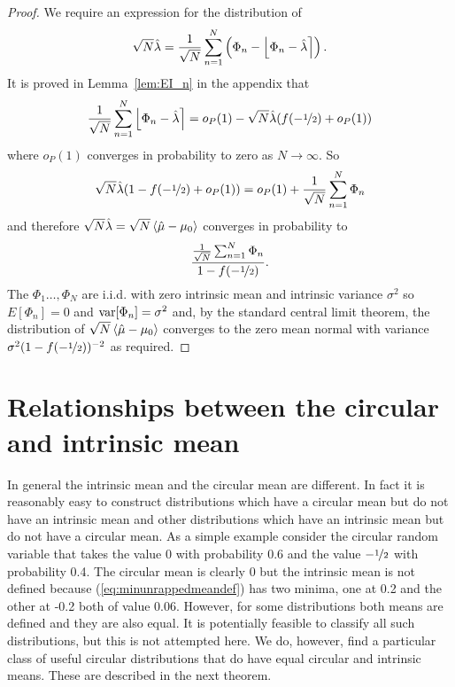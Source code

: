 \documentclass[journal]{../bib/IEEEtran}
\begin{document}
\begin{proof}
We require an expression for the distribution of
\[
\sqrt{N}\hat{\lambda} = \frac{1}{\sqrt{N}}\sum_{n=1}^{N} \left( \Phi_n - {\left\lfloor  \Phi_n - \hat{\lambda}  \right\rceil}\right).
\]
It is proved in Lemma~\ref{lem:EI_n} in the appendix that
\[
\frac{1}{\sqrt{N}}\sum_{n=1}^{N} {\left\lfloor  \Phi_n - \hat{\lambda} \right\rceil} = o_P(1)  - \sqrt{N} \hat{\lambda}( f(-\nicefrac{1}{2}) + o_P(1) )
\]
where $o_P(1)$ converges in probability to zero as $N\rightarrow\infty$.  So
\[
\sqrt{N}\hat{\lambda}(1 - f(-\nicefrac{1}{2}) + o_P(1) ) = o_P(1) + \frac{1}{\sqrt{N}}\sum_{n=1}^{N} \Phi_n
\]
and therefore $\sqrt{N}\hat{\lambda} = \sqrt{N}\left< \hat{\mu} - \mu_0 \right>$ converges in probability to
\[
\frac{\frac{1}{\sqrt{N}}\sum_{n=1}^{N} \Phi_n}{1 - f(-\nicefrac{1}{2})}.
\]
The $\Phi_1\dots,\Phi_N$ are i.i.d. with zero intrinsic mean and intrinsic variance $\sigma^2$ so $E[\Phi_n] = 0$ and $\operatorname{var}[\Phi_n] = \sigma^2$ and, by the standard central limit theorem, the distribution of $\sqrt{N}\left< \hat{\mu} - \mu_0 \right>$ converges to the zero mean normal with variance $\sigma^2(1 - f(-\nicefrac{1}{2}))^{-2}$ as required. 
\end{proof}



\section{Relationships between the circular and intrinsic mean}\label{sec:relationships_circ_intrinsic_mean}

In general the intrinsic mean and the circular mean are different. In fact it is reasonably easy to construct distributions which have a circular mean but do not have an intrinsic mean and other distributions which have an intrinsic mean but do not have a circular mean. As a simple example consider the circular random variable that takes the value 0 with probability 0.6 and the value $-\nicefrac{1}{2}$ with probability 0.4.  The circular mean is clearly 0 but the intrinsic mean is not defined because (\ref{eq:minunrappedmeandef}) has two minima, one at 0.2 and the other at -0.2 both of value 0.06.  However, for some distributions both means are defined and they are also equal. It is potentially feasible to classify all such distributions, but this is not attempted here.  We do, however, find a particular class of useful circular distributions that do have equal circular and intrinsic means. These are described in the next theorem.
\end{document}
